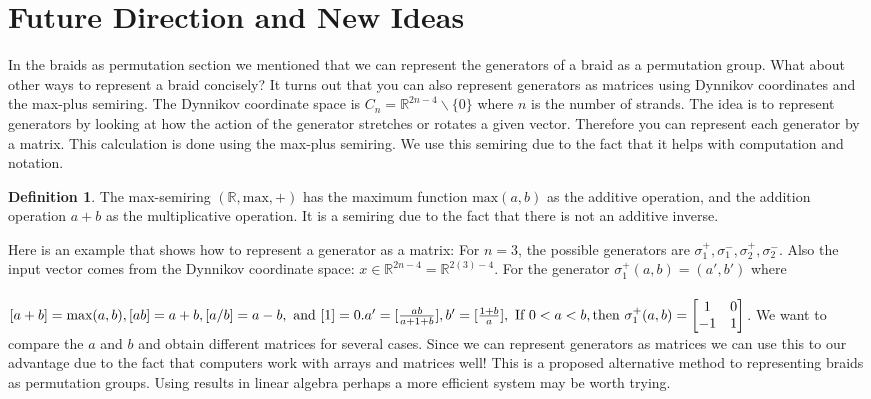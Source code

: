 \documentclass{article}
\theoremstyle{definition}
\newtheorem{definition}{Definition}[section]
\begin{document}
\section{Future Direction and New Ideas}

In the braids as permutation section we mentioned that we can represent the generators of a braid as a permutation group. What about other ways to represent a braid concisely? It turns out that you can also represent generators as matrices using Dynnikov coordinates and the max-plus semiring. The Dynnikov coordinate space is $C_n=\mathbb{R}^{2n-4} \backslash \{0\}$ where $n$ is the number of strands. The idea is to represent generators by looking at how the action of the generator stretches or rotates a given vector. Therefore you can represent each generator by a matrix. This calculation is done using the max-plus semiring. We use this semiring due to the fact that it helps with computation and notation. 

\begin{definition}
The max-semiring $(\mathbb{R},\text{max},+)$ has the maximum function $\text{max}(a,b)$ as the additive operation, and the addition operation $a+b$ as the multiplicative operation. It is a semiring due to the fact that there is not an additive inverse.
\end{definition}

\noindent Here is an example that shows how to represent a generator as a matrix: For $n=3$, the possible generators are $\sigma_1^+, \sigma_1^-, \sigma_2^+, \sigma_2^-$. Also the input vector comes from the Dynnikov coordinate space: $x \in \mathbb{R}^{2n-4} = \mathbb{R}^{2(3)-4}$. For the generator $\sigma_1^+ (a,b)=(a',b')$ where 
\\ \\
$[a+b]=\text{max}(a,b), [ab]=a+b, [a/b]=a-b, \text{ and } [1]=0. \\ \\ a'=[\frac{ab}{a+1+b}], b'=[\frac{1+b}{a}],   \\ \text{ If } 0<a<b , \text{then } \sigma_1^+ (a,b)=
\begin{bmatrix}
1 & 0\\
-1 & 1
\end{bmatrix} $. We want to compare the $a$ and $b$ and obtain different matrices for several cases. Since we can represent generators as matrices we can use this to our advantage due to the fact that computers work with arrays and matrices well! This is a proposed alternative method to representing braids as permutation groups. Using results in linear algebra perhaps a more efficient system may be worth trying. 
\end{document}
